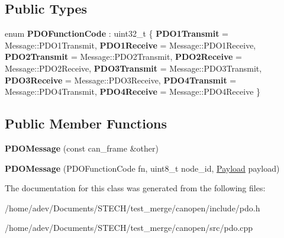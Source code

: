 \subsection*{Public Types}
\begin{DoxyCompactItemize}
\item 
\mbox{\label{class_c_a_nopen_1_1_p_d_o_message_ab46579ce08cec30d0bc60428053cb39f}} 
enum {\bfseries P\+D\+O\+Function\+Code} \+: uint32\+\_\+t \{ \newline
{\bfseries P\+D\+O1\+Transmit} = Message\+:\+:P\+D\+O1\+Transmit, 
{\bfseries P\+D\+O1\+Receive} = Message\+:\+:P\+D\+O1\+Receive, 
{\bfseries P\+D\+O2\+Transmit} = Message\+:\+:P\+D\+O2\+Transmit, 
{\bfseries P\+D\+O2\+Receive} = Message\+:\+:P\+D\+O2\+Receive, 
\newline
{\bfseries P\+D\+O3\+Transmit} = Message\+:\+:P\+D\+O3\+Transmit, 
{\bfseries P\+D\+O3\+Receive} = Message\+:\+:P\+D\+O3\+Receive, 
{\bfseries P\+D\+O4\+Transmit} = Message\+:\+:P\+D\+O4\+Transmit, 
{\bfseries P\+D\+O4\+Receive} = Message\+:\+:P\+D\+O4\+Receive
 \}
\end{DoxyCompactItemize}
\subsection*{Public Member Functions}
\begin{DoxyCompactItemize}
\item 
\mbox{\label{class_c_a_nopen_1_1_p_d_o_message_a461a62c471761504043dfcb13f9ec685}} 
{\bfseries P\+D\+O\+Message} (const can\+\_\+frame \&other)
\item 
\mbox{\label{class_c_a_nopen_1_1_p_d_o_message_ae7f8db2be338aaa9cc61f08520fa0c85}} 
{\bfseries P\+D\+O\+Message} (P\+D\+O\+Function\+Code fn, uint8\+\_\+t node\+\_\+id, \hyperlink{class_c_a_nopen_1_1_payload}{Payload} payload)
\end{DoxyCompactItemize}


The documentation for this class was generated from the following files\+:\begin{DoxyCompactItemize}
\item 
/home/adev/\+Documents/\+S\+T\+E\+C\+H/test\+\_\+merge/canopen/include/pdo.\+h\item 
/home/adev/\+Documents/\+S\+T\+E\+C\+H/test\+\_\+merge/canopen/src/pdo.\+cpp\end{DoxyCompactItemize}
